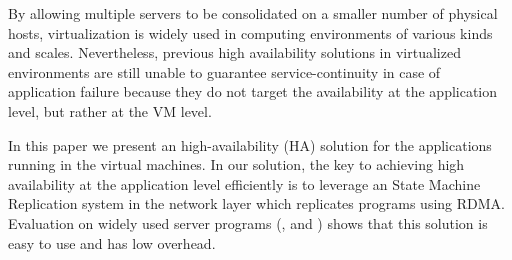 By allowing multiple servers to be consolidated on a smaller number of physical 
hosts, virtualization is widely used in computing environments of various kinds and
scales. Nevertheless, previous high availability solutions in virtualized environments
are still unable to guarantee service-continuity in case of application failure because 
they do not target the availability at the application level, but rather at the VM level.

In this paper we present an high-availability (HA) solution for the applications running in 
the virtual machines. In our solution, the key to achieving high availability at the application 
level efficiently is to leverage an State Machine Replication system in the network layer which 
replicates programs using RDMA. Evaluation on \nprog widely used server programs (\eg, \mysql and 
\redis) shows that this solution is easy to use and has low overhead.
